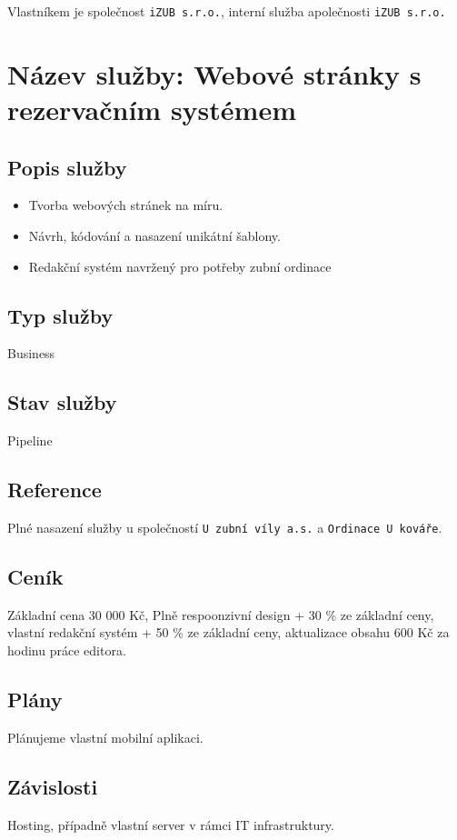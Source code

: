 \documentclass[12pt, a4paper, titlepage]{article}
\begin{document}
	Vlastníkem je společnost \texttt{iZUB s.r.o.}, interní služba apolečnosti \texttt{iZUB s.r.o.}

	\section*{Název služby: Webové stránky s rezervačním systémem}

	\subsection*{Popis služby}
	\begin{itemize}
		\item Tvorba webových stránek na míru.
		\item Návrh, kódování a nasazení unikátní šablony.
		\item Redakční systém navržený pro potřeby zubní ordinace
	\end{itemize}

	\newpage
	\noindent\makebox[\linewidth]{\rule{16cm}{0.4pt}}

	\subsection*{Typ služby}
	Business

	\subsection*{Stav služby}
	Pipeline

	\subsection*{Reference}
	Plné nasazení služby u společností \texttt{U zubní víly a.s.} a \texttt{Ordinace U kováře}.

	\subsection*{Ceník}
	Základní cena 30 000 Kč, Plně respoonzivní design + 30 \% ze základní ceny, vlastní redakční systém + 50 \% ze základní ceny, aktualizace obsahu 600 Kč za hodinu práce editora.

	\subsection*{Plány}
	Plánujeme vlastní mobilní aplikaci.

	\subsection*{Závislosti}
	Hosting, případně vlastní server v rámci IT infrastruktury.
\end{document}
